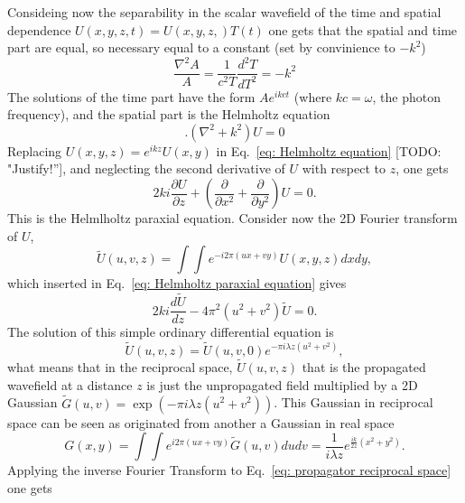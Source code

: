 \documentclass{iucr}              %
\newcommand{\todo}[1]{{\color{red}[TODO: "#1'']}}
\begin{document}
Consideing now the separability in the scalar wavefield of the time and spatial dependence $U(x,y,z,t)=U(x,y,z,)T(t)$ one gets that the spatial and time part are equal, so necessary equal to a constant (set by convinience to $-k^2$)
\begin{equation}
\frac{\nabla^2 A}{A}=\frac{1}{c^2 T} \frac{d^2 T}{dT^2} = -k^2
\end{equation}
The solutions of the time part have the form $ A e^{i k c t}$ (where $k c = \omega$, the photon frequency), and the spatial part is the Helmholtz equation
\begin{equation}\label{eq: Helmholtz equation}.
(\nabla^2 + k^2) U = 0
\end{equation}
Replacing $U(x,y,z)=e^{i k z}U(x,y)$ in Eq.~\ref{eq: Helmholtz equation} \todo{Justify!}, and neglecting the second derivative of $U$ with respect to $z$, one gets
\begin{equation}\label{eq: Helmholtz paraxial equation}
2 k i \frac{\partial U}{\partial z} + \left( \frac{\partial}{\partial x^2} + \frac{\partial}{\partial y^2}\right) U = 0.
\end{equation}
This is the Helmlholtz paraxial equation. Consider now the 2D Fourier transform of $U$,
\begin{equation}\label{eq: ft of U}
\tilde{U}(u,v,z) = \int\int e^{-i 2 \pi (u x + v y) } U(x,y,z) dx dy,
\end{equation}
which inserted in Eq.~\ref{eq: Helmholtz paraxial equation} gives 
\begin{equation}
2 k i \frac{d \tilde{U}}{d z} - 4 \pi^2 (u^2 + v^2) \tilde{U}= 0.
\end{equation}
The solution of this simple ordinary differential equation is
\begin{equation}\label{eq: propagator reciprocal space}
\tilde{U}(u,v,z) = \tilde{U}(u,v,0)  e^{- \pi i \lambda z (u^2 + v^2) },
\end{equation}
what means that in the reciprocal space, $\tilde{U}(u,v,z)$ that is the propagated wavefield at a distance $z$ is just the unpropagated field multiplied by a 2D Gaussian $\tilde{G}(u,v) =  \exp(- \pi i \lambda z (u^2 + v^2) )$. 
This Gaussian in reciprocal space can be seen as originated from another a Gaussian in real space
\begin{equation}
G(x,y) = \int\int e^{i 2 \pi (u x + v y)} \tilde{G}(u,v) du dv = \frac{1}{i \lambda z} e^{\frac{i k}{2 z} (x^2 + y^2)}.
\end{equation}
Applying the inverse Fourier Transform to Eq.~\ref{eq: propagator reciprocal space} one gets
\end{document}
